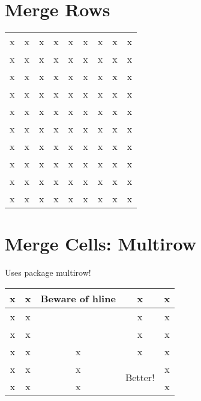 \documentclass[a4paper,10pt]{scrartcl}
\begin{document}
\section{Merge Rows}
\begin{tabular}{cccccccc|c|} \hline
\multicolumn{1}{|c|}{x} & x & x & x & x & x & x & x & x \\ \cline{1-3}
x & x & x & x & x & x & x & x & x \\ 
x & x & x & x & x & x & x & x & x \\ \cline{1-2} \cline{5-6}
x & x & x & x & x & x & x & x & x \\ 
x & x & x & x & x & x & x & x & x \\ \cline{1-1}
\multicolumn{1}{|c|}{x} & x & x & x & x & x & x & x & x \\ \cline{1-2}
\multicolumn{1}{|c|}{x} & \multicolumn{1}{c|}{x} & x & x & x & x & x & x & x \\ \cline{1-3}
\multicolumn{1}{|c|}{x} & \multicolumn{1}{c|}{x} & \multicolumn{1}{c|}{x} & x & x & x & x & x & x \\ \hline
\multicolumn{1}{|c|}{x} & \multicolumn{1}{c|}{x} & \multicolumn{1}{c|}{x} & x & x & x & x & x & x \\ \cline{4 - 9}
\multicolumn{1}{|c|}{x} & \multicolumn{1}{c|}{x} & \multicolumn{1}{c|}{x} & \multicolumn{1}{|c|}{x} & x & x & x & x & x \\ \hline
\end{tabular}
\newline


\section{Merge Cells: Multirow}
Uses package multirow!
\newline

\begin{tabular}{|c|c|c|c|c|} \hline
x & x & \multirow{3}{14mm}{Beware of hline} & x & x \\ \hline
x & x &  & x & x \\ \hline 
x & x &  & x & x \\ \hline
x & x & x & x & x \\ \hline
x & x & x & \multirow{2}{14mm}{Better!} & x \\ \cline{1-3} \cline{5-5}
x & x & x & & x \\ \hline
\end{tabular}
\newline
\end{document}

